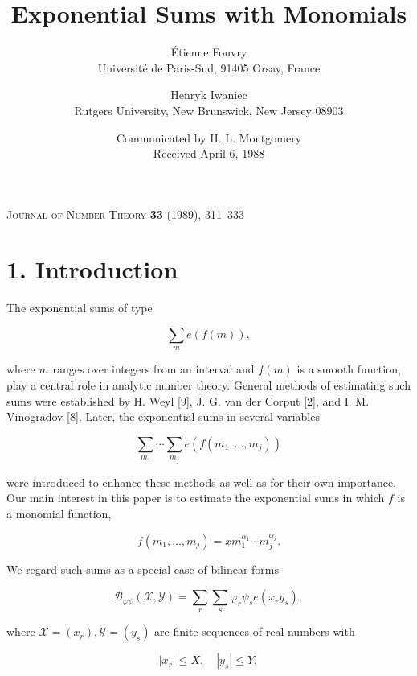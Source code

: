 \documentclass[10pt]{article}
\title{Exponential Sums with Monomials}
\author{Étienne Fouvry\\
  \small Université de Paris-Sud, 91405 Orsay, France
  \and
  Henryk Iwaniec\\
  \small Rutgers University, New Brunswick, New Jersey 08903}
\date{Communicated by H. L. Montgomery\\Received April 6, 1988}
\begin{document}
\maketitle
\begin{center}
  \small\textsc{Journal of Number Theory} \textbf{33} (1989), 311--333
\end{center}

\section*{1. Introduction}
The exponential sums of type


\begin{equation*}
\sum_{m} e(f(m)), \tag{1.1}
\end{equation*}


where $m$ ranges over integers from an interval and $f(m)$ is a smooth function, play a central role in analytic number theory. General methods of estimating such sums were established by H. Weyl [9], J. G. van der Corput [2], and I. M. Vinogradov [8]. Later, the exponential sums in several variables


\begin{equation*}
\sum_{m_{1}} \cdots \sum_{m_{j}} e\left(f\left(m_{1}, \ldots, m_{j}\right)\right) \tag{1.2}
\end{equation*}


were introduced to enhance these methods as well as for their own importance. Our main interest in this paper is to estimate the exponential sums in which $f$ is a monomial function,


\begin{equation*}
f\left(m_{1}, \ldots, m_{j}\right)=x m_{1}^{\alpha_{1}} \cdots m_{j}^{\alpha_{j}} . \tag{1.3}
\end{equation*}


We regard such sums as a special case of bilinear forms


\begin{equation*}
\mathscr{B}_{\varphi \psi}(\mathscr{X}, \mathscr{Y})=\sum_{r} \sum_{s} \varphi_{r} \psi_{s} e\left(x_{r} y_{s}\right), \tag{1.4}
\end{equation*}


where $\mathscr{X}=\left(x_{r}\right), \mathscr{Y}=\left(y_{s}\right)$ are finite sequences of real numbers with


\begin{equation*}
\left|x_{r}\right| \leqslant X, \quad\left|y_{s}\right| \leqslant Y, \tag{1.5}
\end{equation*}
\end{document}
